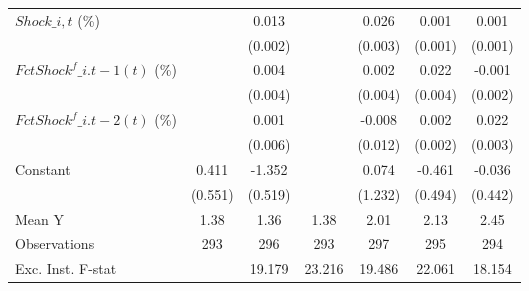 {\begin{tabular}{l*{6}{c}}
\addlinespace
$ Shock\_{i,t}$ (\%) &                     &       0.013\sym{***}&                     &       0.026\sym{***}&       0.001\sym{*}  &       0.001         \\
                    &                     &     (0.002)         &                     &     (0.003)         &     (0.001)         &     (0.001)         \\
\addlinespace
$ FctShock^f\_{i.t-1}(t)$ (\%)&                     &       0.004         &                     &       0.002         &       0.022\sym{***}&      -0.001         \\
                    &                     &     (0.004)         &                     &     (0.004)         &     (0.004)         &     (0.002)         \\
\addlinespace
$ FctShock^f\_{i.t-2}(t)$ (\%)&                     &       0.001         &                     &      -0.008         &       0.002         &       0.022\sym{***}\\
                    &                     &     (0.006)         &                     &     (0.012)         &     (0.002)         &     (0.003)         \\
\addlinespace
Constant            &       0.411         &      -1.352\sym{**} &                     &       0.074         &      -0.461         &      -0.036         \\
                    &     (0.551)         &     (0.519)         &                     &     (1.232)         &     (0.494)         &     (0.442)         \\
\midrule
Mean Y              &        1.38         &        1.36         &        1.38         &        2.01         &        2.13         &        2.45         \\
Observations        &         293         &         296         &         293         &         297         &         295         &         294         \\
Exc. Inst. F-stat   &                     &      19.179         &      23.216         &      19.486         &      22.061         &      18.154         \\
\bottomrule
\end{tabular}
}

